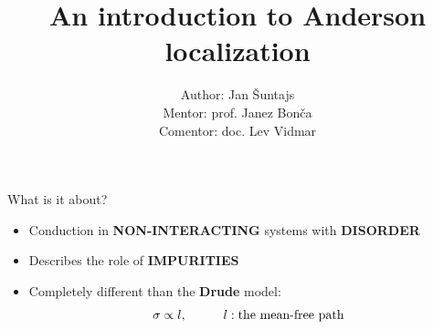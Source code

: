 \documentclass[1pt]{beamer}
\title[Anderson localization ] %
{An introduction to Anderson localization}
\author[Jan Šuntajs] %
{Author: Jan Šuntajs \\ 
Mentor: prof. Janez Bonča \\
Comentor: doc. Lev Vidmar}
\begin{document}
\begin{frame}
  \titlepage
\end{frame}









\begin{frame}{What is it about?}
\begin{minipage}[c]{0.9\textwidth}
\begin{itemize}
\item Conduction in \textbf{NON-INTERACTING} systems with \textbf{DISORDER}
\vspace{15mm}
\item Describes the role of \textbf{IMPURITIES}
\vspace{15mm}
\item Completely different than the \textbf{Drude} model:
$$ \sigma \propto l, \hspace{10mm} l: \text{the mean-free path}$$
\end{itemize}
\end{minipage}
\end{frame}
\end{document}
